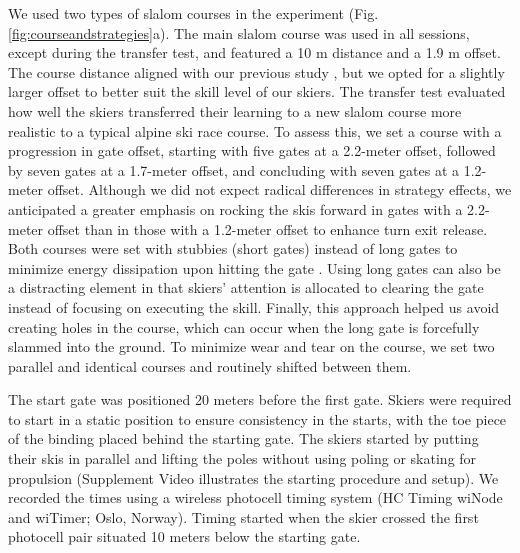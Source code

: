 \documentclass[pdflatex,sn-nature]{sn-jnl}%
\theoremstyle{thmstyleone}%
\theoremstyle{thmstyletwo}%
\theoremstyle{thmstylethree}%
\begin{document}
We used two types of slalom courses in the experiment (Fig. \ref{fig:courseandstrategies}a). The main slalom course was used in all sessions, except during the transfer test, and featured a 10 m distance and a 1.9 m offset. The course distance aligned with our previous study \cite{magelssen_is_2022}, but we opted for a slightly larger offset to better suit the skill level of our skiers. The transfer test evaluated how well the skiers transferred their learning to a new slalom course more realistic to a typical alpine ski race course. To assess this, we set a course with a progression in gate offset, starting with five gates at a 2.2-meter offset, followed by seven gates at a 1.7-meter offset, and concluding with seven gates at a 1.2-meter offset. Although we did not expect radical differences in strategy effects, we anticipated a greater emphasis on rocking the skis forward in gates with a 2.2-meter offset than in those with a 1.2-meter offset to enhance turn exit release. Both courses were set with stubbies (short gates) instead of long gates to minimize energy dissipation upon hitting the gate \cite{minetti_biomechanics_2018}. Using long gates can also be a distracting element in that skiers' attention is allocated to clearing the gate instead of focusing on executing the skill. Finally, this approach helped us avoid creating holes in the course, which can occur when the long gate is forcefully slammed into the ground. To minimize wear and tear on the course, we set two parallel and identical courses and routinely shifted between them.

The start gate was positioned 20 meters before the first gate. Skiers were required to start in a static position to ensure consistency in the starts, with the toe piece of the binding placed behind the starting gate. The skiers started by putting their skis in parallel and lifting the poles without using poling or skating for propulsion (Supplement Video illustrates the starting procedure and setup). We recorded the times using a wireless photocell timing system (HC Timing wiNode and wiTimer; Oslo, Norway). Timing started when the skier crossed the first photocell pair situated 10 meters below the starting gate. 
 
\end{document}
